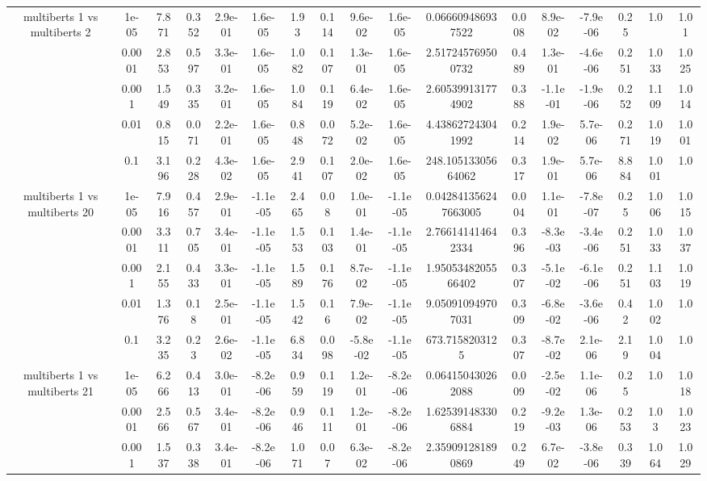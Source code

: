 \begin{tabular}{|c|c|c|c|c|c|c|c|c|c|c|c|c|c|c|c|c|}
\hline
\multirow{5}{*}{multiberts 1 vs multiberts 2} & 1e-05 & 7.871 & 0.352 & 2.9e-01 & 1.6e-05 & 1.93 & 0.114 & 9.6e-02 & 1.6e-05 & 0.066609486937522 & 0.008 & 8.9e-02 & -7.9e-06 & 0.25 & 1.0 & 1.01 \\
 & 0.0001 & 2.853 & 0.597 & 3.3e-01 & 1.6e-05 & 1.082 & 0.107 & 1.3e-01 & 1.6e-05 & 2.517245769500732 & 0.489 & 1.3e-01 & -4.6e-06 & 0.251 & 1.033 & 1.025 \\
 & 0.001 & 1.549 & 0.335 & 3.2e-01 & 1.6e-05 & 1.084 & 0.119 & 6.4e-02 & 1.6e-05 & 2.605399131774902 & 0.388 & -1.1e-01 & -1.9e-06 & 0.252 & 1.109 & 1.014 \\
 & 0.01 & 0.815 & 0.071 & 2.2e-01 & 1.6e-05 & 0.848 & 0.072 & 5.2e-02 & 1.6e-05 & 4.438627243041992 & 0.214 & 1.9e-02 & 5.7e-06 & 0.271 & 1.019 & 1.001 \\
 & 0.1 & 3.196 & 0.228 & 4.3e-02 & 1.6e-05 & 2.941 & 0.107 & 2.0e-02 & 1.6e-05 & 248.10513305664062 & 0.317 & 1.9e-01 & 5.7e-06 & 8.884 & 1.001 & 1.0 \\
\hline
\multirow{5}{*}{multiberts 1 vs multiberts 20} & 1e-05 & 7.916 & 0.457 & 2.9e-01 & -1.1e-05 & 2.465 & 0.08 & 1.0e-01 & -1.1e-05 & 0.042841356247663005 & 0.004 & 1.1e-01 & -7.8e-07 & 0.25 & 1.006 & 1.015 \\
 & 0.0001 & 3.311 & 0.705 & 3.4e-01 & -1.1e-05 & 1.553 & 0.103 & 1.4e-01 & -1.1e-05 & 2.766141414642334 & 0.396 & -8.3e-03 & -3.4e-06 & 0.251 & 1.033 & 1.037 \\
 & 0.001 & 2.155 & 0.433 & 3.3e-01 & -1.1e-05 & 1.589 & 0.176 & 8.7e-02 & -1.1e-05 & 1.9505348205566402 & 0.307 & -5.1e-02 & -6.1e-06 & 0.251 & 1.103 & 1.019 \\
 & 0.01 & 1.376 & 0.18 & 2.5e-01 & -1.1e-05 & 1.542 & 0.16 & 7.9e-02 & -1.1e-05 & 9.050910949707031 & 0.309 & -6.8e-02 & -3.6e-06 & 0.42 & 1.002 & 1.0 \\
 & 0.1 & 3.235 & 0.23 & 2.6e-02 & -1.1e-05 & 6.834 & 0.098 & -5.8e-02 & -1.1e-05 & 673.7158203125 & 0.307 & -8.7e-02 & 2.1e-06 & 2.19 & 1.004 & 1.0 \\
\hline
\multirow{5}{*}{multiberts 1 vs multiberts 21} & 1e-05 & 6.266 & 0.413 & 3.0e-01 & -8.2e-06 & 0.959 & 0.119 & 1.2e-01 & -8.2e-06 & 0.064150430262088 & 0.009 & -2.5e-02 & 1.1e-06 & 0.25 & 1.0 & 1.018 \\
 & 0.0001 & 2.566 & 0.567 & 3.4e-01 & -8.2e-06 & 0.946 & 0.111 & 1.2e-01 & -8.2e-06 & 1.625391483306884 & 0.219 & -9.2e-03 & 1.3e-06 & 0.253 & 1.03 & 1.023 \\
 & 0.001 & 1.537 & 0.338 & 3.4e-01 & -8.2e-06 & 1.071 & 0.07 & 6.3e-02 & -8.2e-06 & 2.359091281890869 & 0.249 & 6.7e-02 & -3.8e-06 & 0.339 & 1.064 & 1.029 \\

\end{tabular}
